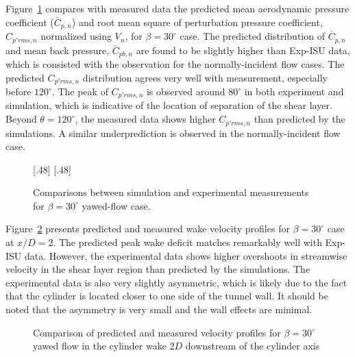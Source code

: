 Figure~\ref{fig:Cp_Compared_Yawed_Exp-ISU} compares with measured data the
predicted mean aerodynamic pressure coefficient ($\overline{C}_{p,n}$) and root
mean square of perturbation pressure coefficient, $C_{p'rms,n}$ normalized
using $V_n$, for $\beta=30^\circ$ case. The predicted distribution of
$\overline{C}_{p,n}$ and mean back pressure, $\overline{C}_{pb,n}$ are found to be
slightly higher than Exp-ISU data, which is consisted with the observation for
the normally-incident flow cases. The predicted $C_{p'rms,n}$ distribution
agrees very well with measurement, especially before $120^\circ$. The peak of
$C_{p'rms,n}$ is observed around $80^\circ$ in both experiment and simulation,
which is indicative of the location of separation of the shear layer. Beyond
$\theta=120^\circ$, the measured data shows higher $C_{p'rms,n}$ than
predicted by the simulations. A similar underprediction is observed in the
normally-incident flow case.
%
\begin{figure}[htb!]
  \centering
    [.48\linewidth]{}
  \hspace*{\fill}
    [.48\linewidth]{}
  \caption{Comparisons between simulation and experimental measurements for
    $\beta=30^\circ$ yawed-flow case.}
\label{fig:Cp_Compared_Yawed_Exp-ISU}
\end{figure}

Figure~\ref{fig:velocity_Yawed30_Re20k.png} presents predicted and measured
wake velocity profiles for $\beta=30^\circ$ case at $x/D=2$. The predicted peak
wake deficit matches remarkably well with Exp-ISU data. However, the
experimental data shows higher overshoots in streamwise velocity in the shear
layer region than predicted by the simulations. The experimental data is also
very slightly asymmetric, which is likely due to the fact that the cylinder is
located closer to one side of the tunnel wall. It should be noted that the
asymmetry is very small and the wall effects are minimal.
%
\begin{figure}[htb!]
  \caption{Comparison of predicted and measured velocity profiles for
    $\beta=30^\circ$ yawed flow in the cylinder wake $2D$ downstream of the cylinder axis}
  \label{fig:velocity_Yawed30_Re20k.png}
\end{figure}

